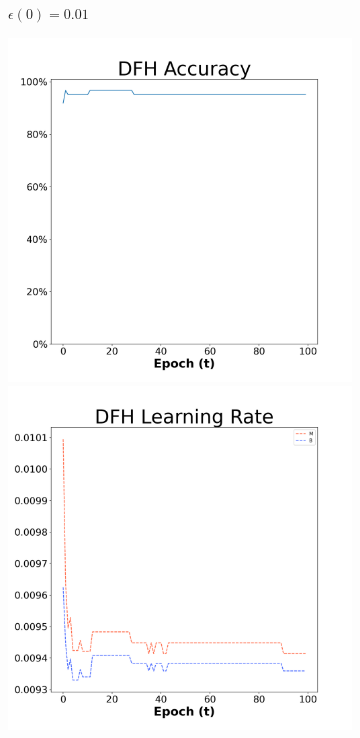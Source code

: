 \begin{figure}[H]
\begin{subfigure}{0.3\textwidth}
  \caption{$\epsilon(0)=0.01$}
\end{subfigure}\hfil %
\begin{subfigure}{0.3\textwidth}
  \includegraphics[width=\linewidth]{images/exper1/breast/DFH_0.03_acc.png}
  \includegraphics[width=\linewidth]{images/exper1/breast/DFH_0.03_lr.png}

\end{subfigure}
\end{figure}
